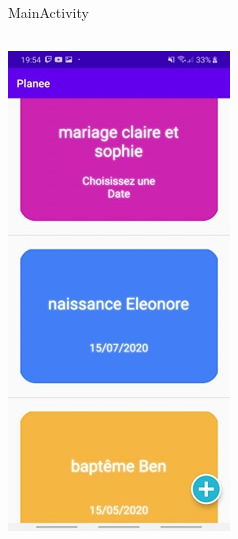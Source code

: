 \documentclass[11pt]{beamer}
\begin{document}
\begin{frame}{MainActivity}
\begin{columns}
\includegraphics[scale=0.4]{HomeWEvents2}


\end{columns}
\end{frame}
\end{document}
